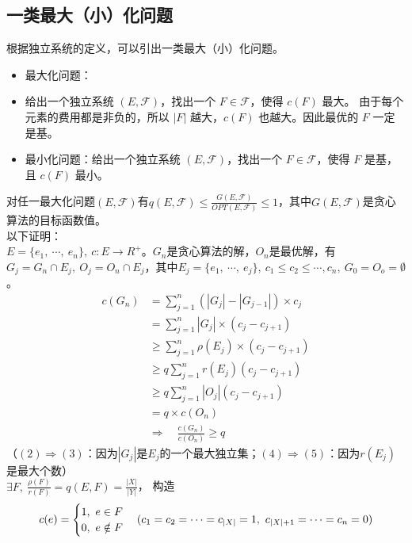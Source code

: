 \subsection{一类最大（小）化问题}
根据独立系统的定义，可以引出一类最大（小）化问题。
\begin{itemize}
    \item 最大化问题：\item 给出一个独立系统 $(E, \mathcal{F})$，找出一个 $F \in \mathcal{F}$，使得 $c(F)$ 最大。
    由于每个元素的费用都是非负的，所以 $|F|$ 越大，$c(F)$ 也越大。因此最优的 $F$ 一定是基。
    \item 最小化问题：给出一个独立系统 $(E, \mathcal{F})$，找出一个 $F \in \mathcal{F}$，使得 $F$ 是基，且 $c(F)$ 最小。
\end{itemize}
对任一最大化问题$(E, \mathcal{F})$有$q(E, \mathcal{F}) \le \frac{G(E, \mathcal{F})}{OPT(E, \mathcal{F})} \le 1$，其中$G(E, \mathcal{F})$是贪心算法的目标函数值。 \\
以下证明： \\
$E = \{e_1, \ \cdots, \ e_n\}, \ c: E \rightarrow R^+$。$G_n$是贪心算法的解，$O_n$是最优解，有$G_j = G_n \cap E_j, \ O_j = O_n \cap E_j$，其中$E_j = \{e_1, \ \cdots, \ e_j\}, \ c_1 \le c_2 \le \cdots, c_n, \ G_0 = O_o = \emptyset$。
\begin{align}
    c(G_n) & = \sum^{n}_{j = 1}(|G_j| - |G_{j - 1}|) \times c_j \tag{1} \\ 
    & = \sum^{n}_{j = 1}|G_j| \times (c_j - c_{j + 1}) \tag{2} \\
    & \ge \sum^{n}_{j = 1}\rho(E_j) \times (c_j - c_{j + 1}) \tag{3} \\ 
    & \ge q\sum^{n}_{j = 1}r(E_j)(c_j - c_{j + 1}) \tag{4} \\
    & \ge q\sum^{n}_{j = 1}|O_j|(c_j - c_{j + 1}) \tag{5} \\ 
    & = q \times c(O_n) \tag{6} \\
    & \Rightarrow \quad \frac{c(G_n)}{c(O_n)} \ge q \tag{7}
\end{align}
（$(2) \Rightarrow (3)$：因为$|G_j|$是$E_j$的一个最大独立集；$(4) \Rightarrow (5)$：因为$r(E_j)$是最大个数） \\
$\exists F, \ \frac{\rho(F)}{r(F)} = q(E, F) = \frac{|X|}{|Y|}$， 构造
$$
c(e) = 
\begin{cases}
1, \ e \in F \\
0, \ e \notin F
\end{cases} \\
(c_1 = c_2 = \cdots = c_{|X|} = 1, \ c_{|X| + 1} = \cdots = c_n = 0)
$$

